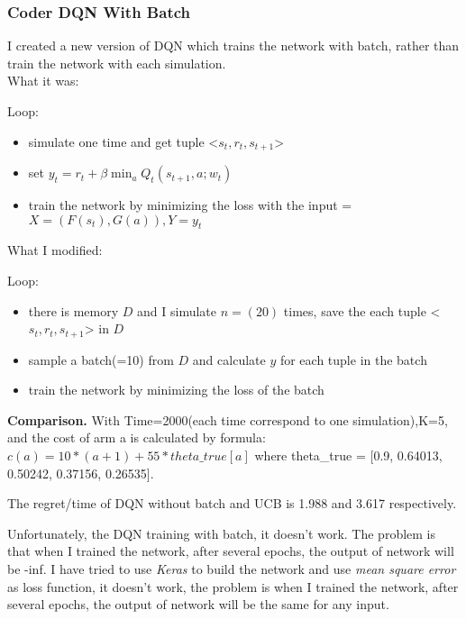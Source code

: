 \subsubsection*{Coder DQN With Batch}
I created a new version of DQN which trains the network with batch, rather than train the network with each simulation.\\

What it was:

Loop:
\begin{itemize}
	
	\item simulate one time and get tuple <$s_t, r_t, s_{t+1}$>
	\item set $y_t = r_t+\beta \min_{a}Q_t(s_{t+1}, a;w_{t})$
	\item train the network by minimizing the loss with the input = $ X = (F(s_t),G(a)), Y = y_t$
\end{itemize}

What I modified:

Loop:
\begin{itemize}
	
	\item there is memory $D$ and I simulate $n=(20)$ times, save the each tuple <$s_t, r_t, s_{t+1}$> in $D$
	\item sample a batch(=10) from $D$ and calculate $y$ for each tuple in the batch
	\item train the network by minimizing the loss of the batch
\end{itemize}

\textbf{Comparison.} With Time=2000(each time correspond to one simulation),K=5, and the cost of arm a is calculated by formula: $c(a) = 10 * (a + 1) + 55 * theta\_true[a]$ where theta\_true = [0.9, 0.64013, 0.50242, 0.37156, 0.26535].

The regret/time of DQN without batch and UCB is 1.988 and 3.617 respectively. 

Unfortunately, the DQN training with batch, it doesn't work. The problem is that when I trained the network, after several epochs, the output of network will be -inf. I have tried to use \textit{Keras} to build the network and use \textit{mean square error} as loss function, it doesn't work, the problem is when I trained the network, after several epochs, the output of network will be the same for any input.

